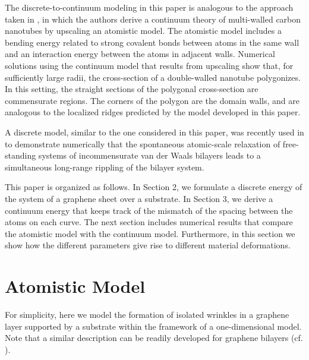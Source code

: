 \documentclass{siamltex}
\begin{document}
The discrete-to-continuum modeling in this paper is analogous to the
approach taken in \cite{golovaty2008continuum}, in which the authors
derive a continuum theory of multi-walled carbon nanotubes by
upscaling an atomistic model.  The atomistic model includes a bending
energy related to strong covalent bonds between atoms in the same wall
and an interaction energy between the atoms in adjacent walls.
Numerical solutions using the continuum model that results from
upscaling show that, for sufficiently large radii, the cross-section
of a double-walled nanotube polygonizes.  In this setting, the
straight sections of the polygonal cross-section are commensurate
regions.  The corners of the polygon are the domain walls, and are
analogous to the localized ridges predicted by the model developed in
this paper.

A discrete model, similar to the one considered in this paper, was recently used in
\cite{cazeaux2017analysis} to demonstrate numerically that the
spontaneous atomic-scale relaxation of free-standing systems of
incommensurate van der Waals bilayers leads to a simultaneous
long-range rippling of the bilayer system.

This paper is organized as follows. In Section 2, we formulate a
discrete energy of the system of a graphene sheet over a substrate.
In Section 3, we derive a continuum energy that keeps
track of the mismatch of the spacing between the atoms on each
curve.  The next section includes numerical results that compare the
atomistic model with the continuum model. Furthermore, in this section
we show how the different parameters give rise to different material
deformations.  %



\section{Atomistic Model} \label{s5}

For simplicity, here we model the formation of isolated wrinkles in a graphene layer
supported by a substrate within the framework of a one-dimensional model. Note that a similar description can be readily developed for graphene bilayers (cf. \cite{golovaty2008continuum}).   
\end{document}
